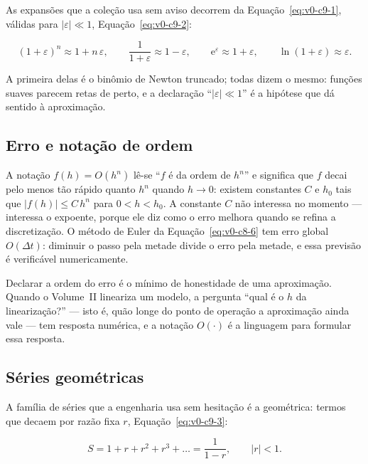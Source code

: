 \documentclass[12pt,a4paper]{article}
\numberwithin{equation}{section}
\numberwithin{table}{section}
\numberwithin{figure}{section}
\begin{document}
As expansões que a coleção usa sem aviso decorrem da
Equação~\eqref{eq:v0-c9-1}, válidas para $|\varepsilon| \ll 1$,
Equação~\eqref{eq:v0-c9-2}:

\begin{equation}\label{eq:v0-c9-2}
(1+\varepsilon)^n \approx 1 + n\,\varepsilon,
\qquad
\frac{1}{1+\varepsilon} \approx 1 - \varepsilon,
\qquad
\mathrm{e}^{\varepsilon} \approx 1 + \varepsilon,
\qquad
\ln(1+\varepsilon) \approx \varepsilon.
\end{equation}

A primeira delas é o binômio de Newton truncado; todas dizem o mesmo:
funções suaves parecem retas de perto, e a declaração
``$|\varepsilon| \ll 1$'' é a hipótese que dá sentido à aproximação.

\subsection{Erro e notação de ordem}

A notação $f(h) = O(h^n)$ lê-se ``$f$ é da ordem de $h^n$'' e significa
que $f$ decai pelo menos tão rápido quanto $h^n$ quando $h \to 0$:
existem constantes $C$ e $h_0$ tais que $|f(h)| \le C\,h^n$ para
$0 < h < h_0$. A constante $C$ não interessa no momento --- interessa o
expoente, porque ele diz como o erro melhora quando se refina a
discretização. O método de Euler da Equação~\eqref{eq:v0-c8-6} tem erro
global $O(\Delta t)$: diminuir o passo pela metade divide o erro pela
metade, e essa previsão é verificável numericamente.

Declarar a ordem do erro é o mínimo de honestidade de uma aproximação.
Quando o Volume~II lineariza um modelo, a pergunta ``qual é o $h$ da
linearização?'' --- isto é, quão longe do ponto de operação a aproximação
ainda vale --- tem resposta numérica, e a notação $O(\cdot)$ é a
linguagem para formular essa resposta.

\subsection{Séries geométricas}

A família de séries que a engenharia usa sem hesitação é a geométrica:
termos que decaem por razão fixa $r$, Equação~\eqref{eq:v0-c9-3}:

\begin{equation}\label{eq:v0-c9-3}
S = 1 + r + r^2 + r^3 + \dots = \frac{1}{1-r},
\qquad |r| < 1.
\end{equation}
\end{document}
